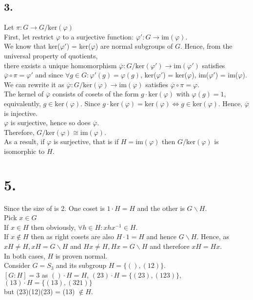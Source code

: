\documentclass[11pt]{article}
\begin{document}
\subsection*{3.}
Let $\pi: G \to G/\text{ker}(\varphi)$ \\
First, let restrict $\varphi$ to a surjective function: $\varphi': G \to \text{im}(\varphi)$. \\ 
We know that ker($\varphi'$) = ker($\varphi$) are normal subgroups of $G$. Hence, from the universal property of quotients, \\
there exsists a unique homomorphism $\overline{\varphi}: G/\text{ker}(\varphi') \to \text{im}(\varphi')$ satisfies $\overline{\varphi} \circ \pi = \varphi'$
and since $\forall g \in G:\varphi'(g) = \varphi(g)$, ker($\varphi'$) = ker($\varphi$), im($\varphi'$) = im($\varphi$). \\
We can rewrite it as $\overline{\varphi}: G/\text{ker}(\varphi) \to \text{im}(\varphi)$ satisfies $\overline{\varphi} \circ \pi = \varphi$. \\
The kernel of $\overline{\varphi}$ consists of cosets of the form $g \cdot \text{ker}(\varphi)$ with $\varphi(g) = 1$, equivalently, $g \in \text{ker}(\varphi)$. Since $g \cdot \text{ker} (\varphi) = \text{ker}(\varphi) \iff g \in \text{ker}(\varphi)$. Hence, $\overline{\varphi}$ is injective. \\
$\varphi$ is surjective, hence so does $\overline{\varphi}$. \\
Therefore, $G/\text{ker}(\varphi) \cong \text{im}(\varphi)$.\\
As a result, if $\varphi$ is surjective, that is if $H = \text{im}(\varphi)$ then $G/\text{ker}(\varphi)$ is isomorphic to $H$. 
\pagebreak
\section*{5.}
Since the size of is 2. One coset is $1 \cdot H = H$ and the other is $G \backslash H$. \\
Pick $x \in G$\\
If $x \in H$ then obviously, $\forall h \in H: xhx^{-1} \in H$. \\
If $x \notin H$ then as right cosets are also $H \cdot 1 = H$ and hence $G \backslash H$. Hence,
as $xH \ne H, xH = G\backslash H$ and $Hx \ne H, Hx = G\backslash H$ and therefore $xH = Hx$. \\
In both cases, $H$ is proven normal. \\
Consider $G = S_3$ and its subgroup $H = \{ (), (12) \}$. \\ 
$[G:H] = 3$ as 
$() \cdot H = H$, $(23) \cdot H = \{(23), (123)\}$, $(13) \cdot H = \{(13), (321)\}$ \\
but (23)(12)(23) = (13) $\notin H$.
\pagebreak
\end{document}
